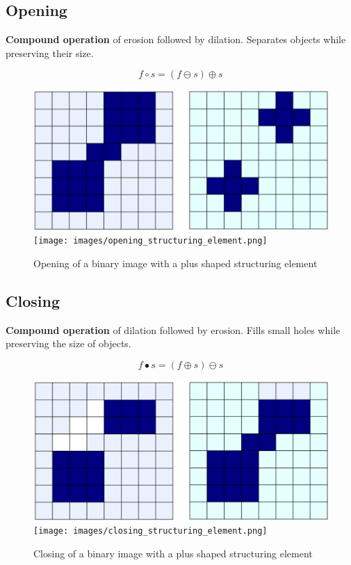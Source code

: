 \subsection*{Opening}

\textbf{Compound operation} of erosion followed by dilation.
Separates objects while preserving their size.

\begin{equation*}
  f \circ s = (f \ominus s) \oplus s
\end{equation*}

\begin{figure}[H]
  \centering
  \includegraphics[width=\linewidth]{images/opening.png}
  \texttt{[image: images/opening\_structuring\_element.png]}
  \caption{Opening of a binary image with a plus shaped structuring element}
\end{figure}

\subsection*{Closing}

\textbf{Compound operation} of dilation followed by erosion. Fills
small holes while preserving the size of objects.

\begin{equation*}
  f \bullet s = (f \oplus s) \ominus s
\end{equation*}

\begin{figure}[H]
  \centering
  \includegraphics[width=\linewidth]{images/closing.png}
  \texttt{[image: images/closing\_structuring\_element.png]}
  \caption{Closing of a binary image with a plus shaped structuring element}
\end{figure}


